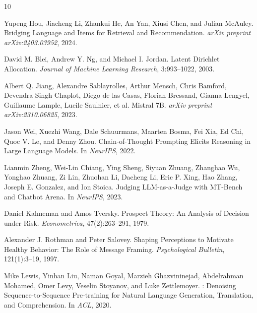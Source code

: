 \documentclass[11pt]{article}
\begin{document}
\begin{thebibliography}{10}

Yupeng Hou, Jiacheng Li, Zhankui He, An Yan, Xiusi Chen, and
Julian McAuley.
\newblock Bridging Language and Items for Retrieval and Recommendation.
\newblock \textit{arXiv preprint arXiv:2403.03952}, 2024.

David M. Blei, Andrew Y. Ng, and Michael I. Jordan.
\newblock Latent {D}irichlet Allocation.
\newblock \textit{Journal of Machine Learning Research}, 3:993--1022, 2003.

Albert Q. Jiang, Alexandre Sablayrolles, Arthur Mensch, Chris Bamford,
Devendra Singh Chaplot, Diego de las Casas, Florian Bressand,
Gianna Lengyel, Guillaume Lample, Lucile Saulnier, et al.
\newblock Mistral 7B.
\newblock \textit{arXiv preprint arXiv:2310.06825}, 2023.

Jason Wei, Xuezhi Wang, Dale Schuurmans, Maarten Bosma, Fei Xia,
Ed Chi, Quoc V. Le, and Denny Zhou.
\newblock Chain-of-{T}hought Prompting Elicits Reasoning in Large Language
  Models.
\newblock In \textit{NeurIPS}, 2022.

Lianmin Zheng, Wei-Lin Chiang, Ying Sheng, Siyuan Zhuang,
Zhanghao Wu, Yonghao Zhuang, Zi Lin, Zhuohan Li, Dacheng Li,
Eric P. Xing, Hao Zhang, Joseph E. Gonzalez, and Ion Stoica.
\newblock Judging {LLM}-as-a-Judge with {MT}-Bench and Chatbot Arena.
\newblock In \textit{NeurIPS}, 2023.

Daniel Kahneman and Amos Tversky.
\newblock Prospect Theory: An Analysis of Decision under Risk.
\newblock \textit{Econometrica}, 47(2):263--291, 1979.

Alexander J. Rothman and Peter Salovey.
\newblock Shaping Perceptions to Motivate Healthy Behavior: The Role of
  Message Framing.
\newblock \textit{Psychological Bulletin}, 121(1):3--19, 1997.

Mike Lewis, Yinhan Liu, Naman Goyal, Marzieh Ghazvininejad,
Abdelrahman Mohamed, Omer Levy, Veselin Stoyanov, and Luke Zettlemoyer.
: Denoising Sequence-to-Sequence Pre-training for Natural
  Language Generation, Translation, and Comprehension.
\newblock In \textit{ACL}, 2020.


\end{thebibliography}
\end{document}
